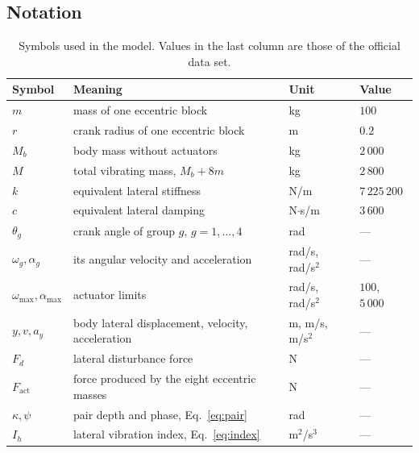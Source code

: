 \documentclass[12pt]{apmcmthesis}
\begin{document}
\subsection{Notation}
\begin{table}[htbp]\centering\small
\caption{Symbols used in the model. Values in the last column are those of the official data set.}
\label{tab:notation}
\begin{tabular}{@{}llll@{}}\toprule
Symbol & Meaning & Unit & Value \\ \midrule
$m$ & mass of one eccentric block & kg & $100$ \\
$r$ & crank radius of one eccentric block & m & $0.2$ \\
$M_b$ & body mass without actuators & kg & $2\,000$ \\
$M$ & total vibrating mass, $M_b+8m$ & kg & $2\,800$ \\
$k$ & equivalent lateral stiffness & N/m & $7\,225\,200$ \\
$c$ & equivalent lateral damping & N$\cdot$s/m & $3\,600$ \\
$\theta_g$ & crank angle of group $g$, $g=1,\dots,4$ & rad & --- \\
$\omega_g,\alpha_g$ & its angular velocity and acceleration & rad/s, rad/s$^2$ & --- \\
$\omega_{\max},\alpha_{\max}$ & actuator limits & rad/s, rad/s$^2$ & $100$, $5\,000$ \\
$y,v,a_y$ & body lateral displacement, velocity, acceleration & m, m/s, m/s$^2$ & --- \\
$F_d$ & lateral disturbance force & N & --- \\
$F_{\text{act}}$ & force produced by the eight eccentric masses & N & --- \\
$\kappa,\psi$ & pair depth and phase, Eq.~\eqref{eq:pair} & rad & --- \\
$I_h$ & lateral vibration index, Eq.~\eqref{eq:index} & m$^2$/s$^3$ & --- \\
\bottomrule\end{tabular}\end{table}
\end{document}
